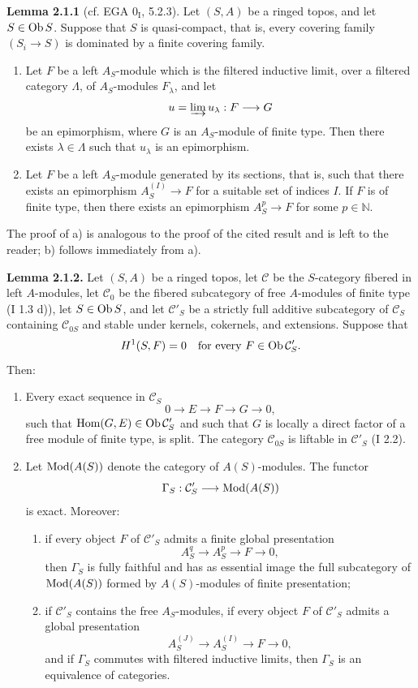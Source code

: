 \documentclass[11pt]{article}
\begin{document}
\textbf{Lemma 2.1.1} (cf. EGA $0_{\mathrm I}$, 5.2.3). Let $(S,A)$ be a ringed topos, and let $S\in\operatorname{Ob} S$. Suppose that $S$ is quasi-compact, that is, every covering family $(S_i\to S)$ is dominated by a finite covering family.
\begin{enumerate}[label=\alph*)]
\item Let $F$ be a left $A_S$-module which is the filtered inductive limit, over a filtered category $\Lambda$, of $A_S$-modules $F_\lambda$, and let
\[
u=\varinjlim u_\lambda:F\longrightarrow G
\]
be an epimorphism, where $G$ is an $A_S$-module of finite type. Then there exists $\lambda\in\Lambda$ such that $u_\lambda$ is an epimorphism.
\item Let $F$ be a left $A_S$-module generated by its sections, that is, such that there exists an epimorphism $A_S^{(I)}\to F$ for a suitable set of indices $I$. If $F$ is of finite type, then there exists an epimorphism $A_S^p\to F$ for some $p\in\mathbb N$.
\end{enumerate}
The proof of a) is analogous to the proof of the cited result and is left to the reader; b) follows immediately from a).

\textbf{Lemma 2.1.2.} Let $(S,A)$ be a ringed topos, let $\mathcal C$ be the $S$-category fibered in left $A$-modules, let $\mathcal C_0$ be the fibered subcategory of free $A$-modules of finite type (I 1.3 d)), let $S\in\operatorname{Ob} S$, and let $\mathcal C'_S$ be a strictly full additive subcategory of $\mathcal C_S$ containing $\mathcal C_{0S}$ and stable under kernels, cokernels, and extensions. Suppose that
\[
H^1(S,F)=0\quad\text{for every }F\in\operatorname{Ob}\mathcal C'_S.
\]
Then:
\begin{enumerate}[label=\alph*)]
\item Every exact sequence in $\mathcal C_S$
\[
0\longrightarrow E\longrightarrow F\longrightarrow G\longrightarrow0,
\]
such that $\operatorname{Hom}(G,E)\in\operatorname{Ob}\mathcal C'_S$ and such that $G$ is locally a direct factor of a free module of finite type, is split. The category $\mathcal C_{0S}$ is liftable in $\mathcal C'_S$ (I 2.2).
\item Let $\operatorname{Mod}(A(S))$ denote the category of $A(S)$-modules. The functor
\[
\Gamma_S:\mathcal C'_S\longrightarrow\operatorname{Mod}(A(S))
\]
is exact. Moreover:
\begin{enumerate}[label=(\roman*)]
\item if every object $F$ of $\mathcal C'_S$ admits a finite global presentation
\[
A_S^q\longrightarrow A_S^p\longrightarrow F\longrightarrow0,
\]
then $\Gamma_S$ is fully faithful and has as essential image the full subcategory of $\operatorname{Mod}(A(S))$ formed by $A(S)$-modules of finite presentation;
\item if $\mathcal C'_S$ contains the free $A_S$-modules, if every object $F$ of $\mathcal C'_S$ admits a global presentation
\[
A_S^{(J)}\longrightarrow A_S^{(I)}\longrightarrow F\longrightarrow0,
\]
and if $\Gamma_S$ commutes with filtered inductive limits, then $\Gamma_S$ is an equivalence of categories.
\end{enumerate}
\end{enumerate}
\end{document}
